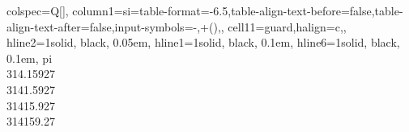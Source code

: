 \begin{table}
\centering
\begin{tblr}[         %
]                     %
{                     %
colspec={Q[]},
column{1}={si={table-format=-6.5,table-align-text-before=false,table-align-text-after=false,input-symbols={-,\*+()}},},
cell{1}{1}={guard,halign=c,},
hline{2}={1}{solid, black, 0.05em},
hline{1}={1}{solid, black, 0.1em},
hline{6}={1}{solid, black, 0.1em},
}                     %
pi \\
314.15927 \\
3141.5927 \\
31415.927 \\
314159.27 \\
\end{tblr}
\end{table} 
